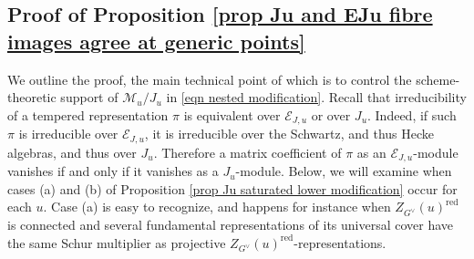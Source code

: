 \documentclass[10pt]{article}
\newcommand{\Ee}{\mathcal{E}}
\theoremstyle{definition}
\theoremstyle{remark}
\newcommand{\Zur}{Z_{G^\vee}(u)^{\mathrm{red}}}
\begin{document}
\subsection{Proof of Proposition \ref{prop Ju and EJu fibre images agree at generic points}}
\label{subsection Proof of prop Ju and EJu imagess agree at generic points}
We outline the proof, the main technical point of which is to control the scheme-theoretic support of
$\mathcal{M}_u/J_u$ in \eqref{eqn nested modification}. 
Recall that irreducibility of a tempered representation $\pi$
is equivalent over $\Ee_{J,u}$ or over $J_u$. Indeed, if such $\pi$ is irreducible
over $\Ee_{J,u}$, it is irreducible over the Schwartz, and thus Hecke algebras, and thus over $J_u$.
Therefore a matrix coefficient of $\pi$ as an $\Ee_{J,u}$-module vanishes if and only if it vanishes as a 
$J_u$-module. Below, we will examine when cases (a) and (b) of Proposition \ref{prop Ju saturated lower modification} occur for each $u$. Case (a) is easy to recognize, and happens for instance when $\Zur$ is connected and several fundamental representations of its universal cover have the same Schur multiplier as projective $\Zur$-representations.
\end{document}
